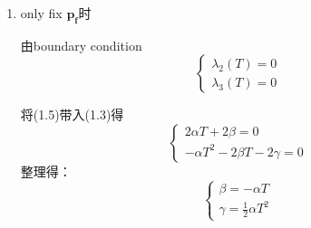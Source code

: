 \documentclass[40pt,a4paper,UTF8]{ctexart}
\numberwithin{equation}{section}
\begin{document}
\begin{enumerate}
\begin{enumerate}
\item only fix $\bm{p_f}$时

由boundary condition
\begin{equation}
\left\{
    \begin{array}{l}
    \lambda_2(T)=0\\
    \lambda_3(T)=0
    \end{array}
\right.
\end{equation}

将(1.5)带入(1.3)得
\begin{equation}
\left\{
    \begin{array}{l}
    2 \alpha T+2 \beta=0\\
    -\alpha T^2-2\beta T-2\gamma=0
    \end{array}
\right.
\end{equation}
整理得：
\begin{equation}
    \left\{
        \begin{array}{l}
        \beta=-\alpha T\\
        \gamma = \frac{1}{2}\alpha T^2
        \end{array}
    \right.
\end{equation}


\end{enumerate}
\end{enumerate}
\end{document}
